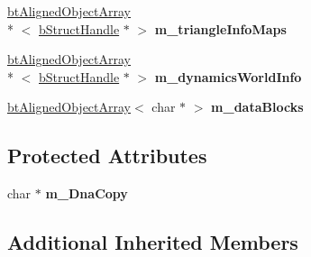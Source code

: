 \begin{DoxyCompactItemize}
\item 
\hypertarget{classb_parse_1_1bt_bullet_file_a2eb7a05746fc3605b7c28327ed46613b}{\hyperlink{classbt_aligned_object_array}{bt\+Aligned\+Object\+Array}\\*
$<$ \hyperlink{structb_parse_1_1b_struct_handle}{b\+Struct\+Handle} $\ast$ $>$ {\bfseries m\+\_\+triangle\+Info\+Maps}}\label{classb_parse_1_1bt_bullet_file_a2eb7a05746fc3605b7c28327ed46613b}

\item 
\hypertarget{classb_parse_1_1bt_bullet_file_a038c091e1432107dd87df60952d6b53c}{\hyperlink{classbt_aligned_object_array}{bt\+Aligned\+Object\+Array}\\*
$<$ \hyperlink{structb_parse_1_1b_struct_handle}{b\+Struct\+Handle} $\ast$ $>$ {\bfseries m\+\_\+dynamics\+World\+Info}}\label{classb_parse_1_1bt_bullet_file_a038c091e1432107dd87df60952d6b53c}

\item 
\hypertarget{classb_parse_1_1bt_bullet_file_a4c39b4e001dbc3a49985b812e0c1893c}{\hyperlink{classbt_aligned_object_array}{bt\+Aligned\+Object\+Array}$<$ char $\ast$ $>$ {\bfseries m\+\_\+data\+Blocks}}\label{classb_parse_1_1bt_bullet_file_a4c39b4e001dbc3a49985b812e0c1893c}

\end{DoxyCompactItemize}
\subsection*{Protected Attributes}
\begin{DoxyCompactItemize}
\item 
\hypertarget{classb_parse_1_1bt_bullet_file_abb36a2187cffe3cf811b5ba7b1ba54d0}{char $\ast$ {\bfseries m\+\_\+\+Dna\+Copy}}\label{classb_parse_1_1bt_bullet_file_abb36a2187cffe3cf811b5ba7b1ba54d0}

\end{DoxyCompactItemize}
\subsection*{Additional Inherited Members}


